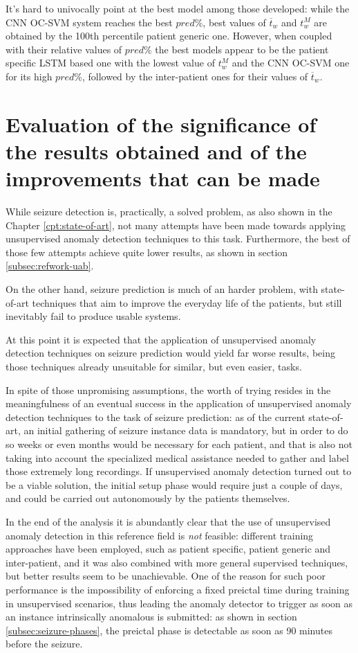 It's hard to univocally point at the best model among those developed: while the \gls{CNN} \gls{OC-SVM} system reaches the best $pred\%$, best values of  $\overline{t}_w$ and $t_w^M$ are obtained by the 100th percentile patient generic one. However, when coupled with their relative values of $pred\%$ the best models appear to be the patient specific \gls{LSTM} based one with the lowest value of $t_w^M$ and the \gls{CNN} \gls{OC-SVM} one for its high $pred\%$, followed by the inter-patient ones for their values of $\overline{t}_w$.

\section{Evaluation of the significance of the results obtained and of the improvements that can be made}
While seizure detection is, practically, a solved problem, as also shown in the Chapter \ref{cpt:state-of-art}, not many attempts have been made towards applying unsupervised anomaly detection techniques to this task. Furthermore, the best of those few attempts achieve quite lower results, as shown in section \ref{subsec:refwork-uab}.

On the other hand, seizure prediction is much of an harder problem, with state-of-art techniques that aim to improve the everyday life of the patients, but still inevitably fail to produce usable systems.

At this point it is expected that the application of unsupervised anomaly detection techniques on seizure prediction would yield far worse results, being those techniques already unsuitable for similar, but even easier, tasks.

In spite of those unpromising assumptions, the worth of trying resides in the meaningfulness of an eventual success in the application of unsupervised anomaly detection techniques to the task of seizure prediction: as of the current state-of-art, an initial gathering of seizure instance data is mandatory, but in order to do so weeks or even months would be necessary for each patient, and that is also not taking into account the specialized medical assistance needed to gather and label those extremely long recordings. If unsupervised anomaly detection turned out to be a viable solution, the initial setup phase would require just a couple of days, and could be carried out autonomously by the patients themselves.

In the end of the analysis it is abundantly clear that the use of unsupervised anomaly detection in this reference field is \textit{not} feasible: different training approaches have been employed, such as patient specific, patient generic and inter-patient, and it was also combined with more general supervised techniques, but better results seem to be unachievable. One of the reason for such poor performance is the impossibility of enforcing a fixed preictal time during training in unsupervised scenarios, thus leading the anomaly detector to trigger as soon as an instance intrinsically anomalous is submitted: as shown in section \ref{subsec:seizure-phases}, the preictal phase is detectable as soon as 90 minutes before the seizure.

